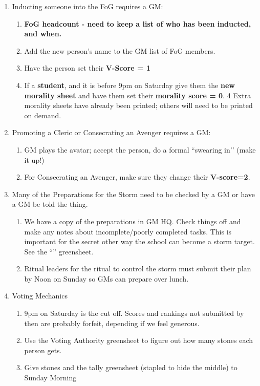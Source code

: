 \documentclass[green]{GL2020}
\begin{document}
\begin{enumerate}
	\item Inducting someone into the FoG requires a GM: 
	\begin{enumerate}
		\item \textbf{FoG headcount - need to keep a list of who has been inducted, and when.}
		\item Add the new person’s name to the GM list of FoG members.
		\item Have the person set their \textbf{V-Score = 1}
		\item If a \textbf{student}, and it is before 9pm on Saturday give them the \textbf{new morality sheet} and have them set their \textbf{morality score = 0}. 4 Extra \pGoaties{} morality sheets have already been printed; others will need to be printed on demand.
	\end{enumerate}
	\item Promoting a Cleric or Consecrating an Avenger requires a GM:
	\begin{enumerate}
		\item GM plays the avatar; accept the person, do a formal ``swearing in’’ (make it up!)
		\item For Consecrating an Avenger, make sure they change their \textbf{V-score=2}.
	\end{enumerate}
	\item Many of the Preparations for the Storm need to be checked by a GM or have a GM be told the thing.
	\begin{enumerate}
		\item We have a copy of the preparations in GM HQ. Check things off and make any notes about incomplete/poorly completed tasks. This is important for the secret other way the school can become a storm target. See the ``\gTallyingVotes{}'' greensheet.
		\item Ritual leaders for the ritual to control the storm must submit their plan by Noon on Sunday so GMs can prepare over lunch.
	\end{enumerate}
	\item Voting Mechanics
	\begin{enumerate}
		\item 9pm on Saturday is the cut off. Scores and rankings not submitted by then are probably forfeit, depending if we feel generous.
		\item Use the Voting Authority greensheet to figure out how many stones each person gets.
		\item Give stones and the tally greensheet (stapled to hide the middle) to \cPrincipal{} Sunday Morning

\end{enumerate}
\end{enumerate}
\end{document}
